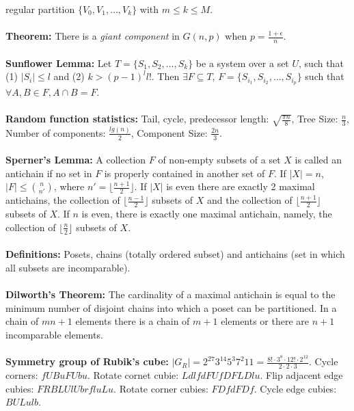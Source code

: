 regular partition $\{ V_0 , V_1 , \ldots , V_k \}$ with $m \leq k \leq M$.
\\
\\
{\bf Theorem:} There is a \emph{giant component} in $G(n,p)$ 
when $p={\frac {1+ \epsilon } {n}}$.\\
\\
{\bf Sunflower Lemma:} Let $T= \{ S_1 , S_2 , \ldots , S_k \}$ be a system over a
set $U$, such that (1) $| S_i | \leq l$ and (2) $k> {(p-1)}^l l!$.  Then
$\exists F \subseteq T$, $F= \{ S_{i_1} , S_{i_2} , \ldots ,
S_{i_p} \}$ such that $\forall A,B \in F,
A \cap B = F$.
\\
\\
{\bf Random function statistics:}
Tail, cycle, predecessor length: ${\sqrt {\frac {\pi n} {8}}}$,
Tree Size: ${\frac {n} {3}}$,
Number of components: ${\frac {lg(n)} {2}}$,
Component Size: ${\frac {2n} {3}}$.  \\
\\
{\bf Sperner's Lemma:}  A collection $F$ of non-empty subsets of a set $X$
is called an antichain
if no set in $F$ is properly contained in another set of $F$.  If $|X|=n$,
$|F| \leq {n \choose n'}$, where $n' = \lfloor {\frac {n+1} {2}} \rfloor$.
If $|X|$ is even there are exactly 2 maximal antichains,
the collection of $\lfloor {\frac {n-1} {2}} \rfloor$ subsets of $X$ and
the collection of $\lfloor {\frac {n+1} {2}} \rfloor$ subsets of $X$.
If $n$ is even, there is exactly one maximal antichain, namely, the
collection of $\lfloor {\frac {n} {2}} \rfloor$ subsets of $X$.
\\
\\
{\bf Definitions:}
Posets, chains (totally ordered subset) and antichains (set in which all
subsets are incomparable).
\\
\\
{\bf Dilworth's Theorem:} The cardinality of a maximal antichain
is equal to the minimum number of disjoint chains into which a poset can be
partitioned. In a chain of $mn+1$ elements there is a chain of $m+1$
elements or there are $n+1$ incomparable elements.  
\\
\\
{\bf Symmetry group of Rubik's cube:} $|G_R|= 2^{27}3^{14}5^3 7^2 11 = {\frac
{8! \cdot 3^8 \cdot 12! \cdot 2^{12}} {2 \cdot 2 \cdot 3}}$.
Cycle corners: $fUBuFUbu$.
Rotate cornet cubie: $LdlfdFUfDFLDlu$.
Flip adjacent edge cubies: $FRBLUlUbrfluLu$.
Rotate corner cubies: $FDfdFDf$.
Cycle edge cubies: $BULulb$.
\\
\\
